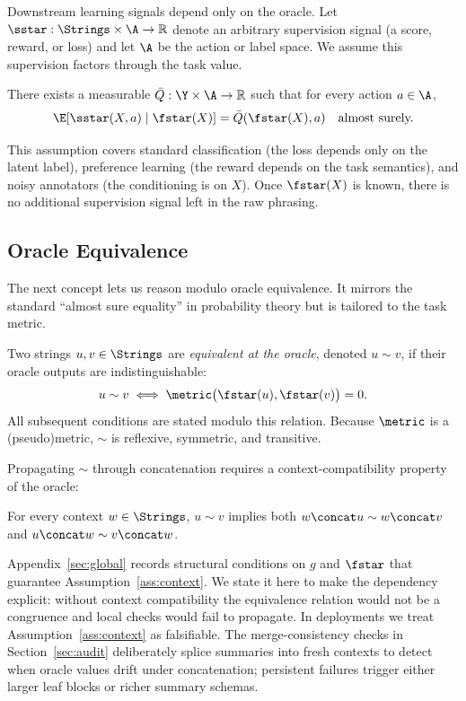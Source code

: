 Downstream learning signals depend only on the oracle. Let $\sstar: \Strings \times \A \to \mathbb{R}$ denote an arbitrary supervision signal (a score, reward, or loss) and let $\A$ be the action or label space. We assume this supervision factors through the task value.

\begin{assumption}\label{ass:CF}
There exists a measurable $\bar{Q}: \Y \times \A \to \mathbb{R}$ such that for every action $a \in \A$,
\[
\E\!\left[\sstar(X, a) \mid \fstar(X)\right] = \bar{Q}(\fstar(X), a) \quad \text{almost surely.}
\]
\end{assumption}

This assumption covers standard classification (the loss depends only on the latent label), preference learning (the reward depends on the task semantics), and noisy annotators (the conditioning is on $X$). Once $\fstar(X)$ is known, there is no additional supervision signal left in the raw phrasing.

\subsection{Oracle Equivalence}

The next concept lets us reason modulo oracle equivalence. It mirrors the standard ``almost sure equality'' in probability theory but is tailored to the task metric.

\begin{definition}\label{def:oracle-equivalence}
Two strings $u, v \in \Strings$ are \emph{equivalent at the oracle}, denoted $u \sim v$, if their oracle outputs are indistinguishable:
\[
u \sim v \;\Longleftrightarrow\; \metric\big(\fstar(u), \fstar(v)\big) = 0.
\]
All subsequent conditions are stated modulo this relation. Because $\metric$ is a (pseudo)metric, $\sim$ is reflexive, symmetric, and transitive.
\end{definition}

Propagating $\sim$ through concatenation requires a context-compatibility property of the oracle:

\begin{assumption}\label{ass:context}
For every context $w \in \Strings$, $u \sim v$ implies both $w \concat u \sim w \concat v$ and $u \concat w \sim v \concat w$.
\end{assumption}

Appendix~\ref{sec:global} records structural conditions on $g$ and $\fstar$ that guarantee Assumption~\ref{ass:context}. We state it here to make the dependency explicit: without context compatibility the equivalence relation would not be a congruence and local checks would fail to propagate. In deployments we treat Assumption~\ref{ass:context} as falsifiable. The merge-consistency checks in Section~\ref{sec:audit} deliberately splice summaries into fresh contexts to detect when oracle values drift under concatenation; persistent failures trigger either larger leaf blocks or richer summary schemas.

